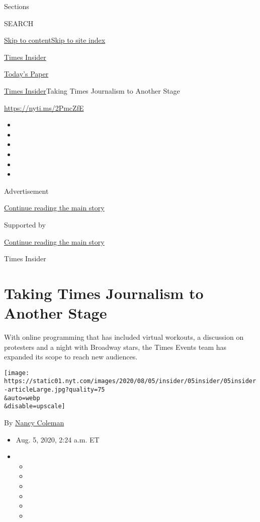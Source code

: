 Sections

SEARCH

\protect\hyperlink{site-content}{Skip to
content}\protect\hyperlink{site-index}{Skip to site index}

\href{https://www.nytimes.com/section/reader-center}{Times Insider}

\href{https://myaccount.nytimes.com/auth/login?response_type=cookie\&client_id=vi}{}

\href{https://www.nytimes.com/section/todayspaper}{Today's Paper}

\href{/section/reader-center}{Times Insider}\textbar{}Taking Times
Journalism to Another Stage

\url{https://nyti.ms/2PmcZfE}

\begin{itemize}
\item
\item
\item
\item
\item
\item
\end{itemize}

Advertisement

\protect\hyperlink{after-top}{Continue reading the main story}

Supported by

\protect\hyperlink{after-sponsor}{Continue reading the main story}

Times Insider

\hypertarget{taking-times-journalism-to-another-stage}{%
\section{Taking Times Journalism to Another
Stage}\label{taking-times-journalism-to-another-stage}}

With online programming that has included virtual workouts, a discussion
on protesters and a night with Broadway stars, the Times Events team has
expanded its scope to reach new audiences.

\texttt{[image: https://static01.nyt.com/images/2020/08/05/insider/05insider/05insider-articleLarge.jpg?quality=75\\\&auto=webp\\\&disable=upscale]}

By \href{https://www.nytimes.com/by/nancy-coleman}{Nancy Coleman}

\begin{itemize}
\item
  Aug. 5, 2020, 2:24 a.m. ET
\item
  \begin{itemize}
  \item
  \item
  \item
  \item
  \item
  \item
  \end{itemize}
\end{itemize}

